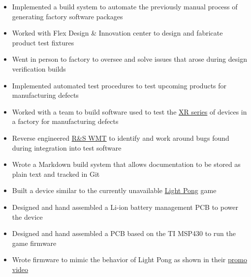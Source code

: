 \documentclass{resume}
\begin{document}
\begin{itemize}
    \item Implemented a build system to automate the previously manual process of generating factory software packages
    \item Worked with Flex Design \& Innovation center to design and fabricate product test fixtures
    \item Went in person to factory to oversee and solve issues that arose during design verification builds
    \item Implemented automated test procedures to test upcoming products for manufacturing defects
\end{itemize}

\begin{itemize}
    \item Worked with a team to build software used to test the \href{https://source.sierrawireless.com/devices/xr-series/xr90/}{XR series} of devices in a factory for manufacturing defects
    \item Reverse engineered \href{https://www.rohde-schwarz.com/us/products/test-and-measurement/wireless-communications-testers-systems/wireless-communication-testers-systems/wireless-manufacturing-test_253261.html}{R\&S WMT} to identify and work around bugs found during integration into test software
    \item Wrote a Markdown build system that allows documentation to be stored as plain text and tracked in Git
\end{itemize}

\TechnicalProjects

\begin{itemize}
    \item Built a device similar to the currently unavailable \href{https://www.playlightpong.com/}{Light Pong} game
    \item Designed and hand assembled a Li-ion battery management PCB to power the device
    \item Designed and hand assembled a PCB based on the TI MSP430 to run the game firmware
    \item Wrote firmware to mimic the behavior of Light Pong as shown in their \href{https://player.vimeo.com/video/616594964}{promo video}
\end{itemize}
\end{document}
